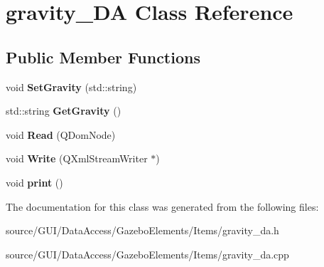 \section{gravity\+\_\+\+DA Class Reference}
\label{classgravity___d_a}
\subsection*{Public Member Functions}
\begin{DoxyCompactItemize}
\item 
void {\bfseries Set\+Gravity} (std\+::string)\label{classgravity___d_a_a30351548a1f77b38fd729b8ebe214163}

\item 
std\+::string {\bfseries Get\+Gravity} ()\label{classgravity___d_a_a842b7538478f5c8030f6f0b2ff0e7d79}

\item 
void {\bfseries Read} (Q\+Dom\+Node)\label{classgravity___d_a_af77356d69dea1a6c63ce8ca35f3b440c}

\item 
void {\bfseries Write} (Q\+Xml\+Stream\+Writer $\ast$)\label{classgravity___d_a_af915bf654e21f61036c703d4e9c752ea}

\item 
void {\bfseries print} ()\label{classgravity___d_a_a6e8e2382aa547c46b0594ad7ff3e645e}

\end{DoxyCompactItemize}


The documentation for this class was generated from the following files\+:\begin{DoxyCompactItemize}
\item 
source/\+G\+U\+I/\+Data\+Access/\+Gazebo\+Elements/\+Items/gravity\+\_\+da.\+h\item 
source/\+G\+U\+I/\+Data\+Access/\+Gazebo\+Elements/\+Items/gravity\+\_\+da.\+cpp\end{DoxyCompactItemize}
